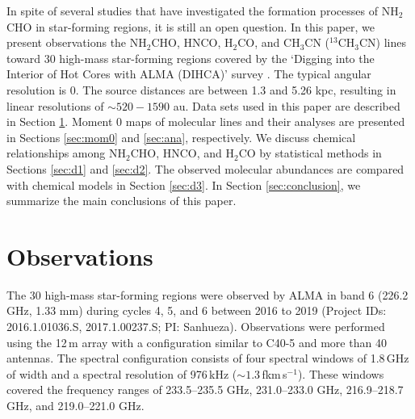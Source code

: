 \documentclass[twocolumn, twocolappendix]{aastex631}
\begin{document}
In spite of several studies that have investigated the formation processes of NH$_{2}$CHO in star-forming regions, it is still an open question.
In this paper, we present observations the NH$_{2}$CHO, HNCO, H$_{2}$CO, and CH$_{3}$CN ($^{13}$CH$_{3}$CN) lines toward 30 high-mass star-forming regions covered by the `Digging into the Interior of Hot Cores with ALMA (DIHCA)' survey \citep{2021ApJ...909..199O,2022ApJ...929...68O}.
The typical angular resolution is 0. 
The source distances are between 1.3 and 5.26 kpc, resulting in linear resolutions of $\sim 520-1590$ au.
Data sets used in this paper are described in Section \ref{sec:data}.
Moment 0 maps of molecular lines and their analyses are presented in Sections \ref{sec:mom0} and \ref{sec:ana}, respectively.
We discuss chemical relationships among NH$_{2}$CHO, HNCO, and H$_{2}$CO by statistical methods in Sections \ref{sec:d1} and \ref{sec:d2}.
The observed molecular abundances are compared with chemical models in Section \ref{sec:d3}.
In Section \ref{sec:conclusion}, we summarize the main conclusions of this paper.


\section{Observations} \label{sec:data}

The 30 high-mass star-forming regions were observed by ALMA in band 6 (226.2 GHz, 1.33 mm) during cycles 4, 5, and 6 between 2016 to 2019 (Project IDs: 2016.1.01036.S, 2017.1.00237.S; PI: Sanhueza).
Observations were performed using the 12\,m array with a configuration similar to C40-5 and more than 40 antennas.
The spectral configuration consists of four spectral windows of 1.8\,GHz of width and a spectral resolution of 976\,kHz ($\sim1.3$\,fkm\,s$^{-1}$).
These windows covered the frequency ranges of 233.5--235.5 GHz, 231.0--233.0 GHz, 216.9--218.7 GHz, and 219.0--221.0 GHz.
\end{document}
